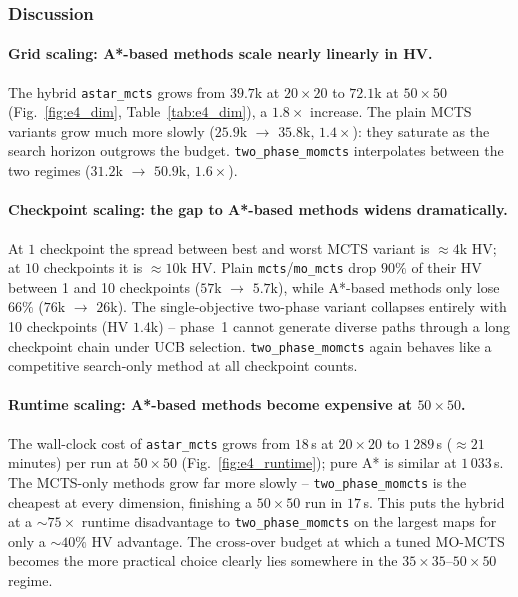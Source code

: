 \subsubsection{Discussion}

\paragraph{Grid scaling: A*-based methods scale nearly linearly in HV.} The hybrid \texttt{astar\_mcts} grows from $39.7$k at $20 \times 20$ to $72.1$k at $50 \times 50$ (Fig.~\ref{fig:e4_dim}, Table~\ref{tab:e4_dim}), a $1.8\times$ increase. The plain MCTS variants grow much more slowly ($25.9$k $\to$ $35.8$k, $1.4\times$): they saturate as the search horizon outgrows the budget. \texttt{two\_phase\_momcts} interpolates between the two regimes ($31.2$k $\to$ $50.9$k, $1.6\times$).

\paragraph{Checkpoint scaling: the gap to A*-based methods widens dramatically.} At $1$ checkpoint the spread between best and worst MCTS variant is $\approx 4$k HV; at $10$ checkpoints it is $\approx 10$k HV. Plain \texttt{mcts}/\texttt{mo\_mcts} drop $90\%$ of their HV between 1 and 10 checkpoints ($57$k $\to$ $5.7$k), while A*-based methods only lose $66\%$ ($76$k $\to$ $26$k). The single-objective two-phase variant collapses entirely with 10 checkpoints (HV $1.4$k) -- phase~1 cannot generate diverse paths through a long checkpoint chain under UCB selection. \texttt{two\_phase\_momcts} again behaves like a competitive search-only method at all checkpoint counts.

\paragraph{Runtime scaling: A*-based methods become expensive at $50 \times 50$.} The wall-clock cost of \texttt{astar\_mcts} grows from $18$\,s at $20 \times 20$ to $1\,289$\,s ($\approx 21$ minutes) per run at $50 \times 50$ (Fig.~\ref{fig:e4_runtime}); pure A* is similar at $1\,033$\,s. The MCTS-only methods grow far more slowly -- \texttt{two\_phase\_momcts} is the cheapest at every dimension, finishing a $50 \times 50$ run in $17$\,s. This puts the hybrid at a $\sim 75 \times$ runtime disadvantage to \texttt{two\_phase\_momcts} on the largest maps for only a $\sim 40\%$ HV advantage. The cross-over budget at which a tuned MO-MCTS becomes the more practical choice clearly lies somewhere in the $35 \times 35$--$50 \times 50$ regime.

